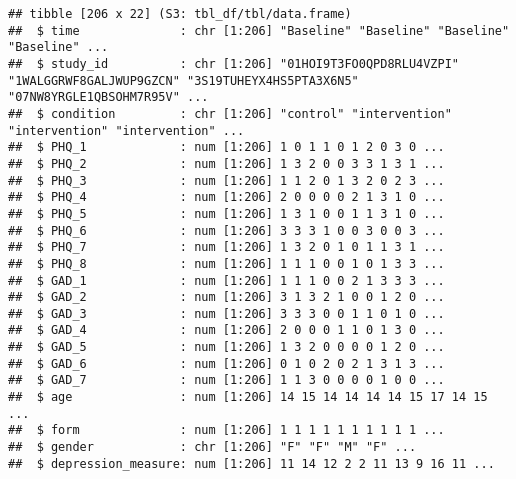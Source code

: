 \documentclass[
]{article}
\begin{document}
\begin{verbatim}
## tibble [206 x 22] (S3: tbl_df/tbl/data.frame)
##  $ time              : chr [1:206] "Baseline" "Baseline" "Baseline" "Baseline" ...
##  $ study_id          : chr [1:206] "01HOI9T3FO0QPD8RLU4VZPI" "1WALGGRWF8GALJWUP9GZCN" "3S19TUHEYX4HS5PTA3X6N5" "07NW8YRGLE1QBSOHM7R95V" ...
##  $ condition         : chr [1:206] "control" "intervention" "intervention" "intervention" ...
##  $ PHQ_1             : num [1:206] 1 0 1 1 0 1 2 0 3 0 ...
##  $ PHQ_2             : num [1:206] 1 3 2 0 0 3 3 1 3 1 ...
##  $ PHQ_3             : num [1:206] 1 1 2 0 1 3 2 0 2 3 ...
##  $ PHQ_4             : num [1:206] 2 0 0 0 0 2 1 3 1 0 ...
##  $ PHQ_5             : num [1:206] 1 3 1 0 0 1 1 3 1 0 ...
##  $ PHQ_6             : num [1:206] 3 3 3 1 0 0 3 0 0 3 ...
##  $ PHQ_7             : num [1:206] 1 3 2 0 1 0 1 1 3 1 ...
##  $ PHQ_8             : num [1:206] 1 1 1 0 0 1 0 1 3 3 ...
##  $ GAD_1             : num [1:206] 1 1 1 0 0 2 1 3 3 3 ...
##  $ GAD_2             : num [1:206] 3 1 3 2 1 0 0 1 2 0 ...
##  $ GAD_3             : num [1:206] 3 3 3 0 0 1 1 0 1 0 ...
##  $ GAD_4             : num [1:206] 2 0 0 0 1 1 0 1 3 0 ...
##  $ GAD_5             : num [1:206] 1 3 2 0 0 0 0 1 2 0 ...
##  $ GAD_6             : num [1:206] 0 1 0 2 0 2 1 3 1 3 ...
##  $ GAD_7             : num [1:206] 1 1 3 0 0 0 0 1 0 0 ...
##  $ age               : num [1:206] 14 15 14 14 14 14 15 17 14 15 ...
##  $ form              : num [1:206] 1 1 1 1 1 1 1 1 1 1 ...
##  $ gender            : chr [1:206] "F" "F" "M" "F" ...
##  $ depression_measure: num [1:206] 11 14 12 2 2 11 13 9 16 11 ...
\end{verbatim}
\end{document}
